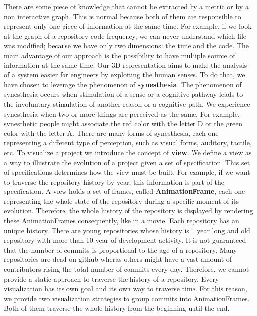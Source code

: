 There are some piece of knowledge that cannot be extracted by a metric or by a non interactive graph. This is normal because both of them are responsible to represent only one piece of information at the same time. For example, if we look at the graph of a repository code frequency, we can never understand which file was modified; because we have only two dimensions: the time and the code. The main advantage of our approach is the possibility to have multiple source of information at the same time. Our 3D representation aims to make the analysis of a system easier for engineers by exploiting the human senses.
To do that, we have chosen to leverage the phenomenon of \textbf{synesthesia}. The phenomenon of synesthesia occurs when stimulation of a sense or a cognitive pathway leads to the involuntary stimulation of another reason or a cognitive path. We experience synesthesia when two or more things are perceived as the same. 
For example, synesthetic people might associate the red color with the letter D or the green color with the letter A. 
There are many forms of synesthesia, each one representing a different type of perception, such as visual forms, auditory, tactile, etc.
\bigbreak
To visualize a project we introduce the concept of \textbf{view}. We define a view as a way to illustrate the evolution of a project given a set of specification. This set of specifications determines how the view must be built. For example, if we want to traverse the repository history by year, this information is part of the specification. A view holds a set of frames, called \textbf{AnimationFrame}, each one representing the whole state of the repository during a specific moment of its evolution. Therefore, the whole history of the repository is displayed by rendering these AnimationFrames consequently, like in a movie. 
\bigbreak
Each repository has an unique history. There are young repositories whose history is 1 year long and old repository with more than 10 year of development activity. It is not guaranteed that the number of commits is proportional to the age of a repository. Many repositories are dead on github wheras others might have a vast amount of contributors rising the total number of commits every day. Therefore, we cannot provide a static approach to traverse the history of a repository. 
Every visualization has its own goal and its own way to traverse time. For this reason, we provide two visualization strategies to group commits into AnimationFrames. Both of them traverse the whole history from the beginning until the end.
